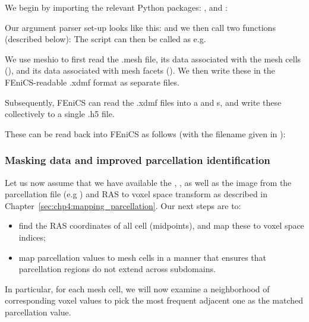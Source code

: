 We begin by importing the relevant Python packages: ,
 and :

\noindent Our argument parser set-up looks like this:
\noindent and we then  call two functions (described below): 
The script can then be called as e.g.

We use meshio to first read the .mesh file, its data associated with
the mesh cells (), and its data associated with mesh
facets (). We then write these in the FEniCS-readable
.xdmf format as separate files.

Subsequently, FEniCS can read the .xdmf files into a
 and s, and write these
collectively to a single .h5 file.

These can be read back into FEniCS as follows (with the filename given in ):

\subsubsection*{Masking data and improved parcellation identification}

Let us now assume that we have available the ,
, as well as the image  from the
parcellation file (e.g ) and RAS to voxel space
transform  as described in
Chapter~\ref{sec:chp4:mapping_parcellation}. Our next steps are to:
\begin{itemize}
\item
  find the RAS coordinates of all cell (midpoints), and map these to
  voxel space indices;
\item
  map parcellation values to mesh cells in a manner that ensures that
  parcellation regions do not extend across subdomains.
\end{itemize}
In particular, for each mesh cell, we will now examine a neighborhood of
corresponding voxel values to pick the most frequent adjacent one as
the matched parcellation value. 


